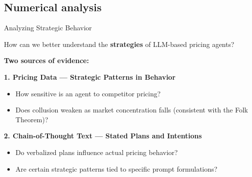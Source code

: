 \documentclass[10pt, aspectratio=169]{beamer}
\begin{document}
\subsection{Numerical analysis}

\begin{frame}{Analyzing Strategic Behavior}

\begin{center}
\begin{tcolorbox}[colback=gray!10, colframe=black, width=0.9\textwidth]
How can we better understand the \textbf{strategies} of LLM-based pricing agents?
\end{tcolorbox}
\end{center}

\textbf{Two sources of evidence:}

\vspace{0.5em}
\textbf{1. Pricing Data — Strategic Patterns in Behavior}
\begin{itemize}
    \item How sensitive is an agent to competitor pricing?
    \item Does collusion weaken as market concentration falls (consistent with the Folk Theorem)?
\end{itemize}

\vspace{0.5em}
\textbf{2. Chain-of-Thought Text — Stated Plans and Intentions}
\begin{itemize}
    \item Do verbalized plans influence actual pricing behavior?
    \item Are certain strategic patterns tied to specific prompt formulations?
\end{itemize}

\end{frame}
\end{document}
